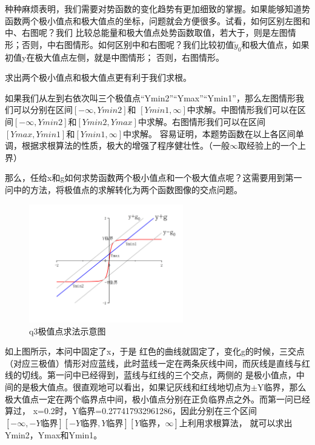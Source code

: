 \documentclass[10pt, a4paper]{article}
\newcommand{\wy}{\widetilde{y}}
\begin{document}
    种种麻烦表明，我们需要对势函数的变化趋势有更加细致的掌握。如果能够知道势函数两个极小值点和极大值点的坐标，问题就会方便很多。试看，如何区别左图和中、右图呢？我们
    比较总能量和极大值点处势函数取值，若大于，则是左图情形；否则，中右图情形。如何区别中和右图呢？我们比较初值$\wy_0$和极大值点，如果初值y在极大值点左侧，就是中图情形；
    否则，右图情形。

    求出两个极小值点和极大值点更有利于我们求根。
    
    如果我们从左到右依次叫三个极值点“Ymin2”“Ymax”“Ymin1”，那么左图情形我们可以分别在区间$[-\infty,Ymin2]$和
    $[Ymin1,\infty]$中求解。中图情形我们可以在区间$[-\infty,Ymin2]$和$[Ymin2,Ymax]$中求解。右图情形我们可以在区间$[Ymax,Ymin1]$和$[Ymin1,\infty]$中求解。
    容易证明，本题势函数在以上各区间单调，根据求根算法的性质，极大的增强了程序健壮性。（一般$\infty$取经验上的一个上界）

    那么，任给x和g如何求势函数两个极小值点和一个极大值点呢？这需要用到第一问中的方法，将极值点的求解转化为两个函数图像的交点问题。

    \begin{figure}[H]
        \centering
        \includegraphics[width=0.6\textwidth]{q3极值点求法示意图.jpg}
        \caption{q3极值点求法示意图}\label{q3极值点求法示意图}
    \end{figure}

    
    如上图所示，本问中固定了x，于是
    红色的曲线就固定了，变化g的时候，三交点（对应三极值）情形对应蓝线，此时蓝线一定在两条灰线中间，而灰线是直线与红线的切线。第一问中已经得到，蓝线与红线的三个交点，两侧的
    是极小值点，中间的是极大值点。很直观地可以看出，如果记灰线和红线地切点为$\pm$Y临界，那么极大值点一定在两个临界点中间，极小值点分别在正负临界点之外。而第一问已经算过，
    x=0.2时，Y临界=0.277417932961286，因此分别在三个区间$[-\infty,-Y\text{临界}][-Y\text{临界},Y\text{临界}][Y\text{临界}，\infty]$上利用求根算法，
    就可以求出Ymin2，Ymax和Ymin1。
\end{document}
